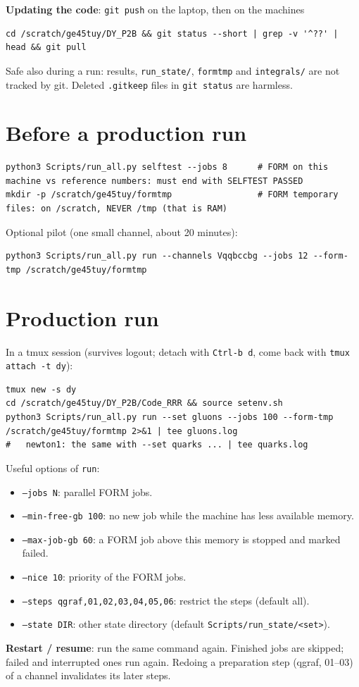 \documentclass[10pt]{article}
\newcommand{\cmd}[1]{\texttt{#1}}
\begin{document}
\textbf{Updating the code}: \cmd{git push} on the laptop, then on the machines
\begin{lstlisting}
cd /scratch/ge45tuy/DY_P2B && git status --short | grep -v '^??' | head && git pull
\end{lstlisting}
Safe also during a run: results, \cmd{run\_state/}, \cmd{formtmp} and \cmd{integrals/} are not tracked by git.
Deleted \cmd{.gitkeep} files in \cmd{git status} are harmless.

\section{Before a production run}
\begin{lstlisting}
python3 Scripts/run_all.py selftest --jobs 8      # FORM on this machine vs reference numbers: must end with SELFTEST PASSED
mkdir -p /scratch/ge45tuy/formtmp                 # FORM temporary files: on /scratch, NEVER /tmp (that is RAM)
\end{lstlisting}
Optional pilot (one small channel, about 20 minutes):
\begin{lstlisting}
python3 Scripts/run_all.py run --channels Vqqbccbg --jobs 12 --form-tmp /scratch/ge45tuy/formtmp
\end{lstlisting}

\section{Production run}
In a tmux session (survives logout; detach with \cmd{Ctrl-b d}, come back with \cmd{tmux attach -t dy}):
\begin{lstlisting}
tmux new -s dy
cd /scratch/ge45tuy/DY_P2B/Code_RRR && source setenv.sh
python3 Scripts/run_all.py run --set gluons --jobs 100 --form-tmp /scratch/ge45tuy/formtmp 2>&1 | tee gluons.log
#   newton1: the same with --set quarks ... | tee quarks.log
\end{lstlisting}
Useful options of \cmd{run}:
\begin{itemize}
\item \cmd{--jobs N}: parallel FORM jobs.
\item \cmd{--min-free-gb 100}: no new job while the machine has less available memory.
\item \cmd{--max-job-gb 60}: a FORM job above this memory is stopped and marked failed.
\item \cmd{--nice 10}: priority of the FORM jobs.
\item \cmd{--steps qgraf,01,02,03,04,05,06}: restrict the steps (default all).
\item \cmd{--state DIR}: other state directory (default \cmd{Scripts/run\_state/<set>}).
\end{itemize}
\textbf{Restart / resume}: run the same command again. Finished jobs are skipped; failed and interrupted ones run
again. Redoing a preparation step (qgraf, 01--03) of a channel invalidates its later steps.
\end{document}
